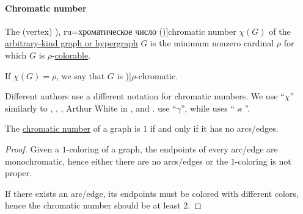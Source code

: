 \paragraph{Chromatic number}

\begin{definition}\label{def:graph_chromatic_number}
  The (vertex) \term[bg=хроматично число (\cite[142]{Мирчев2001}), ru=хроматическое число (\cite[235]{Емеличев1990})]{chromatic number} \( \chi(G) \) of the \hyperref[rem:arbitrary_kind_graph]{arbitrary-kind graph or hypergraph} \( G \) is the minimum nonzero cardinal \( \rho \) for which \( G \) is \( \rho \)-\hyperref[def:graph_coloring/colorable]{colorable}.

  If \( \chi(G) = \rho \), we say that \( G \) is \term[ru=\( \rho \)-хроматический (граф) (\cite[236]{Емеличев1990})]{\( \rho \)-chromatic}.
\end{definition}
\begin{comments}
  \item Different authors use a different notation for chromatic numbers. We use \enquote{\( \chi \)} similarly to , , , Arthur White in \cite[590]{Rosen1999},  and .  use \enquote{\( \gamma \)}, while  uses \enquote{\( \varkappa \)}.
\end{comments}

\begin{proposition}\label{thm:chromatic_number_edgeless}
  The \hyperref[def:graph_chromatic_number]{chromatic number} of a graph is \( 1 \) if and only if it has no arcs/edges.
\end{proposition}
\begin{proof}
  \SufficiencySubProof Given a \( 1 \)-coloring of a graph, the endpoints of every arc/edge are monochromatic, hence either there are no arcs/edges or the \( 1 \)-coloring is not proper.

  \NecessitySubProof If there exists an arc/edge, its endpoints must be colored with different colors, hence the chromatic number should be at least \( 2 \).
\end{proof}

